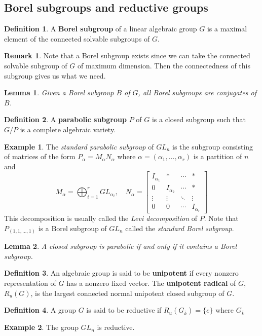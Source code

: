 \documentclass[12pt]{article}
\newtheorem{lemma}{Lemma}[section]
\theoremstyle{remark}
\theoremstyle{definition}
\newtheorem{remark}{Remark}[section]
\newtheorem{example}{Example}[section]
\newtheorem{definition}{Definition}[section]
\begin{document}
    \subsection{Borel subgroups and reductive groups}
    \begin{definition}
        A \textbf{Borel subgroup} of a linear algebraic group $G$ is a maximal element of the connected solvable subgroups of $G$.
    \end{definition}
    \begin{remark}
        Note that a Borel subgroup exists since we can take the connected solvable subgroup of $G$ of maximum dimension. Then the connectedness of this subgroup gives us what we need.
    \end{remark}
    \begin{lemma}
        Given a Borel subgroup $B$ of $G$, all Borel subgroups are conjugates of $B$.
    \end{lemma}
    \begin{definition}
        A \textbf{parabolic subgroup} $P$ of $G$ is a closed subgroup such that $G/P$ is a complete algebraic variety.
    \end{definition}
    \begin{example}
        The \textit{standard parabolic subgroup} of $GL_n$ is the subgroup consisting of matrices of the form $P_\alpha=M_\alpha N_\alpha$ where $\alpha=(\alpha_1,\dots,\alpha_r)$ is a partition of $n$ and
        \[M_\alpha=\bigoplus_{i=1}^r GL_{\alpha_i},\quad N_\alpha=\begin{bmatrix}
            I_{\alpha_1} & * & \cdots & *\\
            0 & I_{\alpha_2} & \cdots & *\\
            \vdots & \vdots & \ddots & \vdots\\
            0 & 0 & \cdots & I_{\alpha_r}
        \end{bmatrix}\]
        This decomposition is usually called the \textit{Levi decomposition} of $P$. Note that $P_{(1,1,\dots,1)}$ is a Borel subgroup of $GL_n$ called the \textit{standard Borel subgroup}.
    \end{example}
    \begin{lemma}
        A closed subgroup is parabolic if and only if it contains a Borel subgroup.
    \end{lemma}
    \begin{definition}
        An algebraic group is said to be \textbf{unipotent} if every nonzero representation of $G$ has a nonzero fixed vector. The \textbf{unipotent radical} of $G$, $R_u(G)$, is the largest connected normal unipotent closed subgroup of $G$.
    \end{definition}
    \begin{definition}
        A group $G$ is said to be reductive if $R_u(G_{\bar k})=\{e\}$ where $G_{\bar k}$
    \end{definition}
    \begin{example}
        The group $GL_n$ is reductive.
    \end{example}
\end{document}
